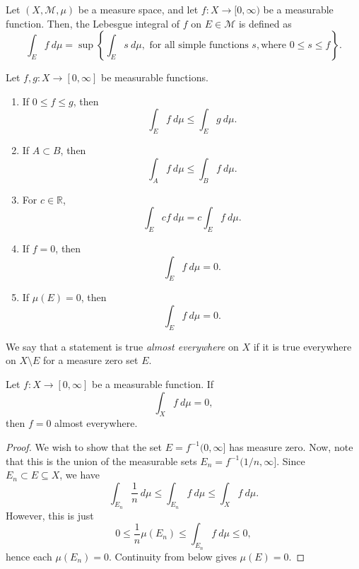 \documentclass[11pt]{article}
\newcommand{\R}{\mathbb{R}}
\newcommand{\M}{\mathcal{M}}
\theoremstyle{definition}
\theoremstyle{remark}
\numberwithin{equation}{section}
\begin{document}
    \begin{definition}
        Let $(X, \M, \mu)$ be a measure space, and let $f\colon X \to [0, \infty)$ be
        a measurable function. Then, the Lebesgue integral of $f$ on $E \in \M$ is
        defined as \[
            \int_E f\:d\mu = \sup\left\{\int_E s\:d\mu, \text{ for all simple
            functions }s, \text{where }0 \leq s \leq f\right\}.
        \]
    \end{definition}

    \begin{theorem}
        Let $f, g\colon X \to [0, \infty]$ be measurable functions.
        \begin{enumerate}
            \item If $0 \leq f \leq g$, then \[
                \int_E f\:d\mu \leq \int_E g\:d\mu.
            \]
            \item If $A \subset B$, then \[
                \int_A f\:d\mu \leq \int_B f\:d\mu.
            \]
            \item For $c \in \R$, \[
                \int_E cf\:d\mu = c\int_E f\:d\mu.
            \]
            \item If $f = 0$, then \[
                \int_E f\:d\mu = 0.
            \]
            \item If $\mu(E) = 0$, then \[
                \int_E f\:d\mu = 0.
            \]
        \end{enumerate}
    \end{theorem}

    \begin{definition}
        We say that a statement is true \emph{almost everywhere} on $X$ if it is true
        everywhere on $X\setminus E$ for a measure zero set $E$.
    \end{definition}

    \begin{lemma}
        Let $f\colon X \to [0, \infty]$ be a measurable function. If \[
            \int_X f\:d\mu = 0,
        \] then $f = 0$ almost everywhere.
    \end{lemma}
    \begin{proof}
        We wish to show that the set $E = f^{-1}(0, \infty]$ has measure zero. Now,
        note that this is the union of the measurable sets $E_n = f^{-1}(1 / n,
        \infty]$. Since $E_n \subset E \subseteq X$, we have \[
            \int_{E_n} \frac{1}{n}\:d\mu \leq \int_{E_n} f\:d\mu \leq \int_X f\:d\mu.
        \] However, this is just \[
            0 \leq \frac{1}{n}\mu(E_n) \leq \int_{E_n} f\:d\mu \leq 0,
        \] hence each $\mu(E_n) = 0$. Continuity from below gives $\mu(E) = 0$.
    \end{proof}
\end{document}
